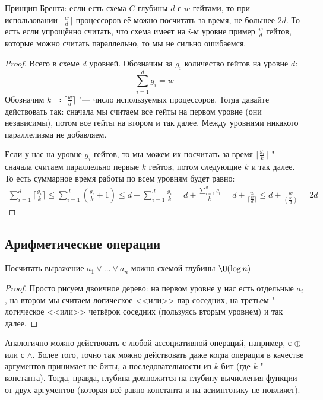 	\begin{theorem}
		Принцип Брента: если есть схема $C$ глубины $d$ с $w$ гейтами, то при использовании $\lceil \frac{w}{d} \rceil$ процессоров её можно посчитать за время, не большее $2d$.
		То есть если упрощённо считать, что схема имеет на $i$-м уровне пример $\frac{w}{d}$ гейтов, которые можно считать параллельно, то мы не сильно ошибаемся.
	\end{theorem}
	\begin{proof}
		Всего в схеме $d$ уровней.
		Обозначим за $g_i$ количество гейтов на уровне $d$:
		\[ \sum_{i=1}^d g_i = w \]
		Обозначим $k \eqcolon \lceil \frac{w}{d} \rceil$ "--- число используемых процессоров.
		Тогда давайте действовать так: сначала мы считаем все гейты на первом уровне (они независимы), потом все гейты на втором и так далее.
		Между уровнями никакого параллелизма не добавляем.

		Если у нас на уровне $g_i$ гейтов, то мы можем их посчитать за время $\lceil \frac{g_i}{k} \rceil$ "--- сначала считаем параллельно первые $k$ гейтов, потом следующие $k$ и так далее.
		То есть суммарное время работы по всем уровням будет равно:
		\begin{gather*}
			\sum_{i=1}^d \lceil \frac{g_i}{k} \rceil \le
			\sum_{i=1}^d \left(\frac{g_i}{k} + 1\right) \le
			d + \sum_{i=1}^d \frac{g_i}{k} = 
			d + \frac{\sum_{i=1}^d  g_i}{k} = 
			d + \frac{w}{\lceil \frac wd \rceil} \le
			d + \frac{w}{\left(\frac wd\right)} = 2d
		\end{gather*}
	\end{proof}

\subsection{Арифметические операции}
	\begin{lemma}
		Посчитать выражение $a_1 \lor \dots \lor a_n$ можно схемой глубины $\O(\log n)$
	\end{lemma}
	\begin{proof}
		Просто рисуем двоичное дерево: на первом уровне у нас есть отдельные $a_i$, на втором мы считаем логическое <<или>> пар соседних,
		на третьем "--- логическое <<или>> четвёрок соседних (пользуясь вторым уровнем) и так далее.
	\end{proof}
	\begin{Rem}
		Аналогично можно действовать с любой ассоциативной операций, например, с $\oplus$ или с $\land$.
		Более того, точно так можно действовать даже когда операция в качестве аргументов принимает не биты, а последовательности из $k$ бит (где $k$ "--- константа).
		Тогда, правда, глубина домножится на глубину вычисления функции от двух аргументов (которая всё равно константа и на асимптотику не повлияет).
	\end{Rem}

